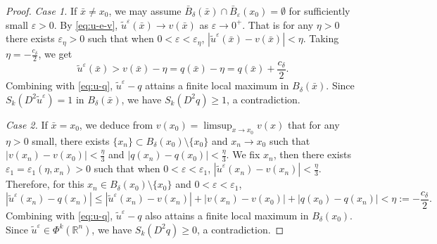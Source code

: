 \documentclass[reqno]{amsart}
\theoremstyle{remark}
\theoremstyle{definition}
\numberwithin{equation}{section}
\begin{document}
\begin{proof}
	\textit{Case 1.} If $\bar{x}\neq x_0$, we may assume \(\bar{B}_\delta(\bar{x})\cap\bar{B}_\varepsilon(x_0)=\emptyset\) for sufficiently small \(\varepsilon > 0\). 
	By \eqref{eq:u-e-v}, \(\tilde{u}^\varepsilon(\bar{x}) \to v(\bar{x})\) as $\varepsilon\to 0^+$. That is for any \(\eta > 0\) there exists \(\varepsilon_\eta > 0\) such that when \(0<\varepsilon < \varepsilon_\eta\), \(|\tilde{u}^\varepsilon(\bar{x}) - v(\bar{x})| < \eta\). Taking $\eta=-\frac{c_\delta}{2}$, we get
	\begin{equation*}
		\tilde{u}^{\varepsilon}(\bar{x})>v(\bar{x})-\eta=q(\bar{x})-\eta=q(\bar{x})+\frac{c_\delta}{2}.
	\end{equation*}
	Combining with \eqref{eq:u-q}, \(\tilde{u}^\varepsilon - q\) attains  a finite local maximum in \(B_\delta(\bar{x})\). Since \(S_k(D^2\tilde{u}^\varepsilon) = 1\) in \(B_\delta(\bar{x})\), we have \(S_k(D^2q) \geq 1\), a contradiction.

	\textit{Case 2.} If $\bar{x}=x_0$, we deduce from \( v(x_0) = \limsup_{x \to x_0} v(x) \)   that for any \( \eta > 0 \) small, there exists \(\{x_n\} \subset B_\delta(x_0) \setminus \{x_0\}\) and \( x_n \to x_0 \) such that \(|v(x_n) - v(x_0)| < \frac{\eta}{3}\) and \(|q(x_n)-q(x_0)|<\frac{\eta}{3}\). We fix \( x_n \), then there exists \( \varepsilon_1 = \varepsilon_1(\eta, x_n) > 0 \) such that when \( 0<\varepsilon < \varepsilon_1 \), \( |\tilde{u}^\varepsilon(x_n) - v(x_n)| < \frac{\eta}{3} \). Therefore, for this \( x_n \in B_\delta(x_0)\setminus\{x_0\} \) and $0<\varepsilon<\varepsilon_1$,
	\[
	|\tilde{u}^\varepsilon(x_n) - q(x_n)| \leq |\tilde{u}^\varepsilon(x_n) - v(x_n)| + |v(x_n) - v(x_0)| + |q(x_0) - q(x_n)| < \eta:=-\frac{c_\delta}{2}.
	\]
	Combining with \eqref{eq:u-q}, \( \tilde{u}^\varepsilon - q \) also attains a finite local maximum in \( B_\delta(x_0) \). Since $\tilde{u}^\varepsilon\in\Phi^k(\mathbb{R}^n)$, we have \( S_k(D^2q) \geq 0 \), a contradiction. 
\end{proof}
\end{document}
